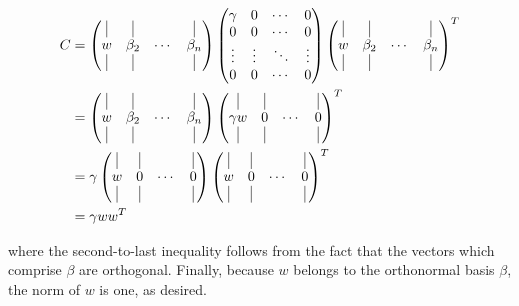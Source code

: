 \begin{solution}
    \begin{align*}
        C &= \begin{pmatrix}
            \vline & \vline & & \vline \\
            w & \beta_2 & \cdots & \beta_n \\
            \vline & \vline & & \vline
        \end{pmatrix} \begin{pmatrix}
            \gamma & 0 & \cdots & 0 \\
            0 & 0 & \cdots & 0 \\
            \vdots & \vdots & \ddots & \vdots \\
            0 & 0 & \cdots & 0
        \end{pmatrix} \begin{pmatrix}
            \vline & \vline & & \vline \\
            w & \beta_2 & \cdots & \beta_n \\
            \vline & \vline & & \vline
        \end{pmatrix}^T  \\
        &= \begin{pmatrix}
            \vline & \vline & & \vline \\
            w & \beta_2 & \cdots & \beta_n \\
            \vline & \vline & & \vline
        \end{pmatrix} \begin{pmatrix}
            \vline & \vline & & \vline \\
            \gamma w & 0 & \cdots & 0 \\
            \vline & \vline & & \vline
        \end{pmatrix}^T \\
        &= \gamma \begin{pmatrix}
            \vline & \vline & & \vline \\
            w & 0 & \cdots & 0 \\
            \vline & \vline & & \vline
        \end{pmatrix} \begin{pmatrix}
            \vline & \vline & & \vline \\
            w & 0 & \cdots & 0 \\
            \vline & \vline & & \vline
        \end{pmatrix}^T \\
        &= \gamma w w^T
    \end{align*}

    where the second-to-last inequality follows from the fact that the vectors which comprise $\beta$ are orthogonal.
    Finally, because $w$ belongs to the orthonormal basis $\beta$, the norm of $w$ is one, as desired.
    \ \\
\end{solution}

